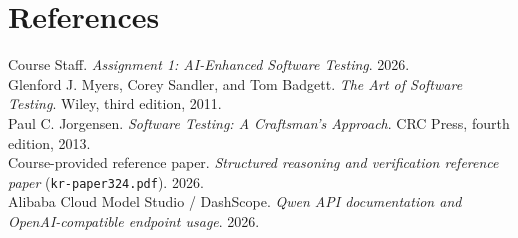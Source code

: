 \documentclass{article}
\begin{document}
\section*{References}
\noindent [1] Course Staff. \emph{Assignment 1: AI-Enhanced Software Testing}. 2026.\\
\noindent [2] Glenford J. Myers, Corey Sandler, and Tom Badgett. \emph{The Art of Software Testing}. Wiley, third edition, 2011.\\
\noindent [3] Paul C. Jorgensen. \emph{Software Testing: A Craftsman's Approach}. CRC Press, fourth edition, 2013.\\
\noindent [4] Course-provided reference paper. \emph{Structured reasoning and verification reference paper} (\texttt{kr-paper324.pdf}). 2026.\\
\noindent [5] Alibaba Cloud Model Studio / DashScope. \emph{Qwen API documentation and OpenAI-compatible endpoint usage}. 2026.
\end{document}
